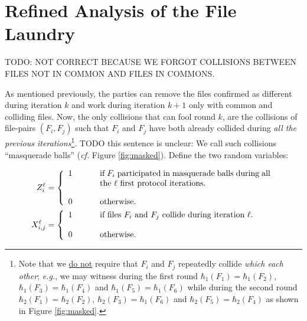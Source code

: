 \documentclass[11pt]{llncs}
\newcommand{\cf}{\textit{cf.}\xspace}
\newcommand{\eg}{\textit{e.g.}\xspace}
\begin{document}
\nocite{rsync}
\nocite{wagner}



\appendix

\section{Refined Analysis of the File Laundry}
\label{app:refined-file-laundry}

TODO: NOT CORRECT BECAUSE WE FORGOT COLLISIONS BETWEEN FILES NOT IN COMMON AND FILES IN COMMONS.

As mentioned previously, the parties can remove the files confirmed as different during iteration $k$ and work during iteration $k+1$ only with common and colliding files. Now, the only collisions that can fool round $k$, are the collisions of file-pairs $(F_i,F_j)$ such that $F_i$ and $F_j$ have both already collided during \textit{all the previous iterations}\footnote{Note that we \underline{do not} require that $F_i$ and $F_j$ repeatedly collide \textit{which each other}; \eg, we may witness during the first round $\hbar_{1}(F_1)=\hbar_{1}(F_2)$, $\hbar_{1}(F_3)=\hbar_{1}(F_4)$ and $\hbar_{1}(F_5)=\hbar_{1}(F_6)$ while during the second round $\hbar_{2}(F_1)=\hbar_2(F_2)$, $\hbar_{2}(F_3)=\hbar_{1}(F_6)$ and $\hbar_{2}(F_5)=\hbar_{2}(F_4)$ as shown in Figure \ref{fig:masked}.}. TODO this sentence is unclear: We call such collisions ``masquerade balls'' (\cf Figure \ref{fig:masked}). Define the two random variables:

\begin{align*}
Z^\ell_i &=
\left\{
\begin{array}{lcl}
1 & ~~~~&  \parbox[t]{0.6\textwidth}{if $F_i$ participated in masquerade balls during all the $\ell$ first protocol iterations.}\\
\\
0 & ~~~~&  \mbox{otherwise.}
\end{array}
\right. \\
X^{\ell}_{i,j} &=
\left\{
\begin{array}{lcl}
1 & ~~~~&  \parbox[t]{0.6\textwidth}{if files $F_i$ and $F_j$ collide during iteration $\ell$.}\\
\\
0 & ~~~~&  \mbox{otherwise.}
\end{array}
\right.
\end{align*}

\def\bruijn{file $F_1$,file $F_2$,file $F_3$,file $F_4$,file $F_5$,file $F_6$}
\end{document}
